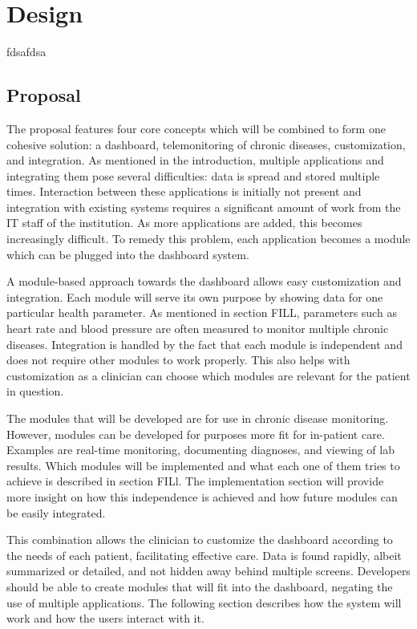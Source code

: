 \section{Design}\label{design}

fdsafdsa

\subsection{Proposal}
    
    The proposal features four core concepts which will be combined to form one cohesive solution: a dashboard, telemonitoring of chronic diseases, customization, and integration. As mentioned in the introduction, multiple applications and integrating them pose several difficulties: data is spread and stored multiple times. Interaction between these applications is initially not present and integration with existing systems requires a significant amount of work from the IT staff of the institution. As more applications are added, this becomes increasingly difficult. To remedy this problem, each application becomes a module which can be plugged into the dashboard system.

    A module-based approach towards the dashboard allows easy customization and integration. Each module will serve its own purpose by showing data for one particular health parameter. As mentioned in section FILL, parameters such as heart rate and blood pressure are often measured to monitor multiple chronic diseases. Integration is handled by the fact that each module is independent and does not require other modules to work properly. This also helps with customization as a clinician can choose which modules are relevant for the patient in question. %

    The modules that will be developed are for use in chronic disease monitoring. However, modules can be developed for purposes more fit for in-patient care. Examples are real-time monitoring, documenting diagnoses, and viewing of lab results. Which modules will be implemented and what each one of them tries to achieve is described in section FILl. The implementation section will provide more insight on how this independence is achieved and how future modules can be easily integrated. %

    This combination allows the clinician to customize the dashboard according to the needs of each patient, facilitating effective care. Data is found rapidly, albeit summarized or detailed, and not hidden away behind multiple screens. Developers should be able to create modules that will fit into the dashboard, negating the use of multiple applications. The following section describes how the system will work and how the users interact with it.

